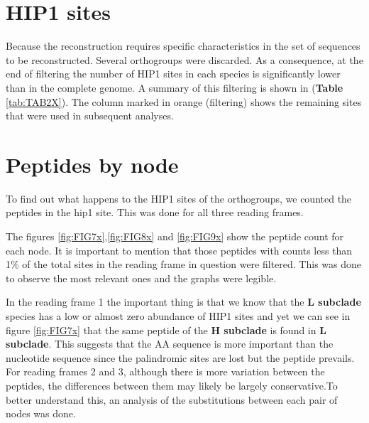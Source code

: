 \documentclass[
]{book}
\begin{document}
\hypertarget{hip1-sites-1}{%
\section{HIP1 sites}\label{hip1-sites-1}}

Because the reconstruction requires specific characteristics in the set of sequences to be reconstructed. Several orthogroups were discarded. As a consequence, at the end of filtering the number of HIP1 sites in each species is significantly lower than in the complete genome. A summary of this filtering is shown in (\textbf{Table} \ref{tab:TAB2X}). The column marked in orange (filtering) shows the remaining sites that were used in subsequent analyses.

\hypertarget{peptides-by-node-1}{%
\section{Peptides by node}\label{peptides-by-node-1}}

To find out what happens to the HIP1 sites of the orthogroups, we counted the peptides in the hip1 site. This was done for all three reading frames.

The figures \ref{fig:FIG7x},\ref{fig:FIG8x} and \ref{fig:FIG9x} show the peptide count for each node. It is important to mention that those peptides with counts less than 1\% of the total sites in the reading frame in question were filtered. This was done to observe the most relevant ones and the graphs were legible.

In the reading frame 1 the important thing is that we know that the \textbf{L subclade} species has a low or almost zero abundance of HIP1 sites and yet we can see in figure \ref{fig:FIG7x} that the same peptide of the \textbf{H subclade} is found in \textbf{L subclade}. This suggests that the AA sequence is more important than the nucleotide sequence since the palindromic sites are lost but the peptide prevails. For reading frames 2 and 3, although there is more variation between the peptides, the differences between them may likely be largely conservative.To better understand this, an analysis of the substitutions between each pair of nodes was done.
\end{document}
